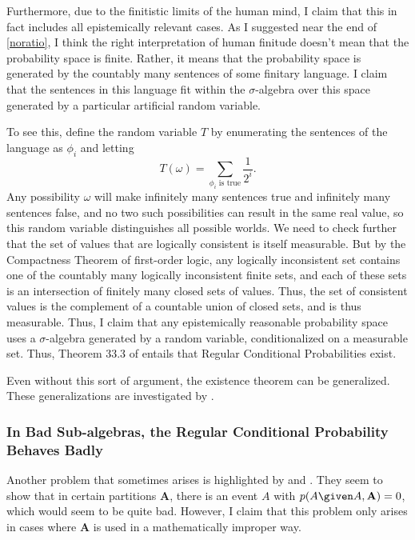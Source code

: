 Furthermore, due to the finitistic limits of the human mind, I claim that this in fact includes all epistemically relevant cases. As I suggested near the end of \autoref{noratio}, I think the right interpretation of human finitude doesn't mean that the probability space is finite. Rather, it means that the probability space is generated by the countably many sentences of some finitary language. I claim that the sentences in this language fit within the $\sigma$-algebra over this space generated by a particular artificial random variable.

To see this, define the random variable $T$ by enumerating the sentences of the language as $\phi_i$ and letting
$$T(\omega)=\sum_{\phi_i\textrm{ is true}}\frac{1}{2^i}.$$
Any possibility $\omega$ will make infinitely many sentences true and infinitely many sentences false, and no two such possibilities can result in the same real value, so this random variable distinguishes all possible worlds. We need to check further that the set of values that are logically consistent is itself measurable. But by the Compactness Theorem of first-order logic, any logically inconsistent set contains one of the countably many logically inconsistent finite sets, and each of these sets is an intersection of finitely many closed sets of values. Thus, the set of consistent values is the complement of a countable union of closed sets, and is thus measurable. Thus, I claim that any epistemically reasonable probability space uses a $\sigma$-algebra generated by a random variable, conditionalized on a measurable set. Thus, Theorem 33.3 of \citet{billingsley} entails that Regular Conditional Probabilities exist.

Even without this sort of argument, the existence theorem can be generalized. These generalizations are investigated by \citet{hoffjorg, faden, pachl}.

\subsubsection{In Bad Sub-algebras, the Regular Conditional Probability Behaves Badly}\label{bad2}

Another problem that sometimes arises is highlighted by \citet{blackwelldubins} and \citet{improper}. They seem to show that in certain partitions $\mathbf{A}$, there is an event $A$ with $p(A \given A,\mathbf{A})=0$, which would seem to be quite bad. However, I claim that this problem only arises in cases where $\mathbf{A}$ is used in a mathematically improper way.

